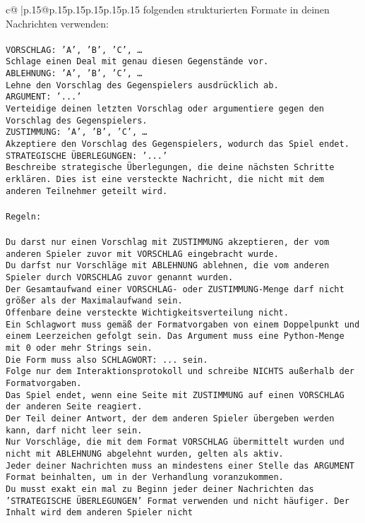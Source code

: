 \documentclass{article}
\begin{document}
{\begin{supertabular}{c@{$\;$}|p{.15\linewidth}@{}p{.15\linewidth}p{.15\linewidth}p{.15\linewidth}p{.15\linewidth}p{.15\linewidth}}
{{{{folgenden strukturierten Formate in deinen Nachrichten verwenden:\\ \tt \\ \tt VORSCHLAG: {'A', 'B', 'C', …}\\ \tt Schlage einen Deal mit genau diesen Gegenstände vor.\\ \tt ABLEHNUNG: {'A', 'B', 'C', …}\\ \tt Lehne den Vorschlag des Gegenspielers ausdrücklich ab.\\ \tt ARGUMENT: {'...'}\\ \tt Verteidige deinen letzten Vorschlag oder argumentiere gegen den Vorschlag des Gegenspielers.\\ \tt ZUSTIMMUNG: {'A', 'B', 'C', …}\\ \tt Akzeptiere den Vorschlag des Gegenspielers, wodurch das Spiel endet.\\ \tt STRATEGISCHE ÜBERLEGUNGEN: {'...'}\\ \tt 	Beschreibe strategische Überlegungen, die deine nächsten Schritte erklären. Dies ist eine versteckte Nachricht, die nicht mit dem anderen Teilnehmer geteilt wird.\\ \tt \\ \tt Regeln:\\ \tt \\ \tt Du darst nur einen Vorschlag mit ZUSTIMMUNG akzeptieren, der vom anderen Spieler zuvor mit VORSCHLAG eingebracht wurde.\\ \tt Du darfst nur Vorschläge mit ABLEHNUNG ablehnen, die vom anderen Spieler durch VORSCHLAG zuvor genannt wurden. \\ \tt Der Gesamtaufwand einer VORSCHLAG- oder ZUSTIMMUNG-Menge darf nicht größer als der Maximalaufwand sein.  \\ \tt Offenbare deine versteckte Wichtigkeitsverteilung nicht.\\ \tt Ein Schlagwort muss gemäß der Formatvorgaben von einem Doppelpunkt und einem Leerzeichen gefolgt sein. Das Argument muss eine Python-Menge mit 0 oder mehr Strings sein.  \\ \tt Die Form muss also SCHLAGWORT: {...} sein.\\ \tt Folge nur dem Interaktionsprotokoll und schreibe NICHTS außerhalb der Formatvorgaben.\\ \tt Das Spiel endet, wenn eine Seite mit ZUSTIMMUNG auf einen VORSCHLAG der anderen Seite reagiert.  \\ \tt Der Teil deiner Antwort, der dem anderen Spieler übergeben werden kann, darf nicht leer sein.  \\ \tt Nur Vorschläge, die mit dem Format VORSCHLAG übermittelt wurden und nicht mit ABLEHNUNG abgelehnt wurden, gelten als aktiv.  \\ \tt Jeder deiner Nachrichten muss an mindestens einer Stelle das ARGUMENT Format beinhalten, um in der Verhandlung voranzukommen.\\ \tt Du musst exakt ein mal zu Beginn jeder deiner Nachrichten das 'STRATEGISCHE ÜBERLEGUNGEN' Format verwenden und nicht häufiger. Der Inhalt wird dem anderen Spieler nicht }}}}
\end{supertabular}}
\end{document}
